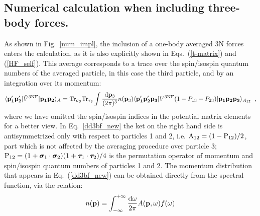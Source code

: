 \subsection{Numerical calculation when including three-body forces.}
As shown in Fig.~\ref{num_impl}, the inclusion of a one-body averaged 3N forces enters the calculation, as it is also explicitly shown in Eqs.~(\ref{t-matrix}) and (\ref{HF_self}). This average corresponds to a trace over the spin/isospin quantum numbers of the averaged particle, in this case the third particle, and by an integration over its momentum:
\begin{equation}
\langle {\bf p'_1 p'_2}|\tilde V^\mathrm{3NF}|{\bf p_1 p_2}\rangle_A =
\mathrm{Tr}_{\sigma_3}\mathrm{Tr}_{\tau_3}
\int \frac{{\mathrm d}{\bf p}_3}{(2\pi)^3}n({\bf p}_3)
\langle {\bf p_1' p_2' p_3}|V^\mathrm{3NF}
(1-P_{13}-P_{23})
|{\bf p_1 p_2 p_3}\rangle_{A_{12}}\ \,,
\label{dd3bf_new}
\end{equation}
where we have omitted the spin/isospin indices in the potential matrix elements for a better view. In Eq.~\ref{dd3bf_new} the ket on the right hand side is antisymmetrized only with respect to particles 1 and 2, i.e. ${\rm A}_{12}=(1-{\rm P}_{12})/2$, part which is not affected by the averaging procedure over particle 3; ${\rm P}_{12}=(1+\boldsymbol \sigma_1\cdot\boldsymbol \sigma_2)(1+\boldsymbol \tau_1\cdot\boldsymbol \tau_2)/4$ is the permutation operator of momentum and spin/isospin quantum numbers of particles 1 and 2. The momentum distribution that appears in Eq.~(\ref{dd3bf_new}) can be obtained directly from the spectral function, via the relation:
\begin{equation}
\label{mom_dist}
n({\bf p})=\int_{-\infty}^{+\infty}\frac{{\rm d}\omega}{2\pi}A({\bf p},\omega)f(\omega)
\end{equation}

